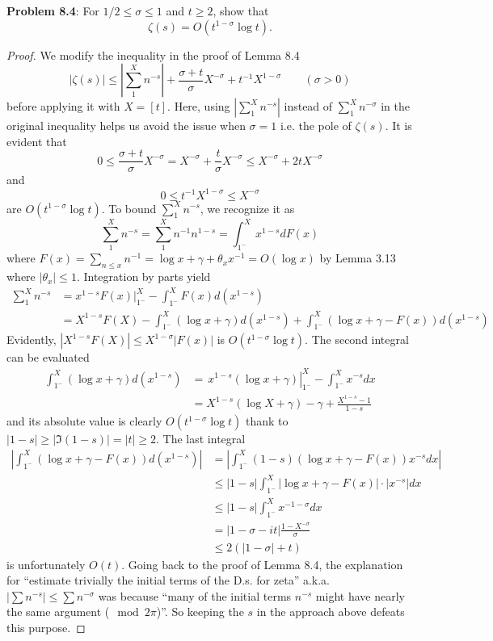 \documentclass[12pt]{article}
\newcommand{\Abs}[1]{\left| #1 \right|}
\begin{document}
\textbf{Problem 8.4}: For $1/2 \leq \sigma \leq 1$ and $t \geq 2$, show that
$$\zeta(s) = O(t^{1-\sigma} \log t).$$

\begin{proof}
We modify the inequality in the proof of Lemma 8.4
$$|\zeta(s)| \leq \Abs{ \sum_1^X n^{-s} } + \frac{\sigma + t}{\sigma} X^{-\sigma} + t^{-1} X^{1-\sigma} \qquad (\sigma > 0)$$
before applying it with $X = [t]$. Here, using $\Abs{ \sum_1^X n^{-s} }$ instead of $\sum_1^X n^{-\sigma}$ in the original inequality helps us avoid the issue when $\sigma = 1$ i.e. the pole of $\zeta(s)$. It is evident that
$$0 \leq \frac{\sigma + t}{\sigma} X^{-\sigma} = X^{-\sigma} + \frac{t}{\sigma} X^{-\sigma} \leq X^{-\sigma} + 2 t X^{-\sigma}$$
and
$$0 \leq t^{-1} X^{1-\sigma} \leq X^{-\sigma}$$
are $O(t^{1-\sigma} \log t)$. To bound $\sum_1^X n^{-s}$, we recognize it as
$$\sum_1^X n^{-s} = \sum_1^X n^{-1} n^{1-s} = \int_{1^-}^{X} x^{1-s} d F(x)$$
where $F(x) = \sum_{n \leq x} n^{-1} = \log x + \gamma + \theta_x x^{-1} = O(\log x)$ by Lemma 3.13 where $|\theta_x| \leq 1$. Integration by parts yield
\begin{align*}
\sum_1^X n^{-s} &= x^{1-s} F(x)|_{1^-}^X - \int_{1^-}^{X} F(x) d(x^{1-s}) \\
&= X^{1-s} F(X) - \int_{1^-}^{X} (\log x + \gamma) d(x^{1-s}) + \int_{1^-}^{X} (\log x + \gamma - F(x)) d(x^{1-s})
\end{align*}
Evidently, $|X^{1-s} F(X)| \leq X^{1-\sigma} |F(x)|$ is $O(t^{1-\sigma} \log t)$. The second integral can be evaluated
\begin{align*}
\int_{1^-}^{X} (\log x + \gamma) d(x^{1-s}) &= \left. \frac{}{} x^{1-s} (\log x + \gamma) \right|_{1^-}^{X} -  \int_{1^-}^{X} x^{-s} dx\\
&= X^{1-s} (\log X + \gamma) - \gamma + \frac{X^{1-s} - 1}{1-s}
\end{align*}
and its absolute value is clearly $O(t^{1-\sigma} \log t)$ thank to $|1 - s| \geq |\Im(1 - s)| = |t| \geq 2$. The last integral
\begin{align*}
\Abs{ \int_{1^-}^{X} (\log x + \gamma - F(x)) d(x^{1-s}) } &= \Abs{ \int_{1^-}^{X} (1 - s) (\log x + \gamma - F(x)) x^{-s} dx }\\
&\leq |1 - s| \int_{1^-}^{X} |\log x + \gamma - F(x)| \cdot |x^{-s}| dx\\
&\leq |1 - s| \int_{1^-}^{X} x^{-1-\sigma} dx\\
&= |1 - \sigma - i t| \frac{1 - X^{-\sigma}}{\sigma}\\
&\leq 2(|1 - \sigma| + t)
\end{align*}
is unfortunately $O(t)$. Going back to the proof of Lemma 8.4, the explanation for ``estimate trivially the initial terms of the D.s. for zeta'' a.k.a. $|\sum n^{-s}| \leq \sum n^{-\sigma}$ was because ``many of the initial terms $n^{-s}$ might have nearly the same argument ($\mod 2\pi$)''. So keeping the $s$ in the approach above defeats this purpose.


\end{proof}
\end{document}
